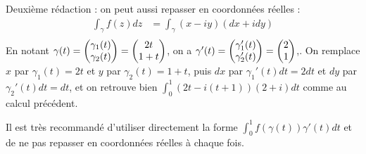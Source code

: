 Deuxième rédaction : on peut aussi repasser en coordonnées réelles : 
\begin{align*}
\int_{\gamma} f(z)dz 
&= \int_{\gamma} (x-iy)(dx+idy) \\
\end{align*}
En notant $\gamma(t) = \begin{pmatrix}\gamma_1(t) \\ \gamma_2(t) \end{pmatrix} = \begin{pmatrix}2t \\ 1+t \end{pmatrix}$, on a $\gamma'(t) = \begin{pmatrix}\gamma_1'(t) \\ \gamma_2'(t) \end{pmatrix} = \begin{pmatrix}2 \\ 1 \end{pmatrix}$,.
On remplace $x$ par $\gamma_1(t)=2t$ et $y$ par $\gamma_2(t)=1+t$, puis $dx$ par $\gamma_1'(t)dt=2dt$ et $dy$ par $\gamma_2'(t)dt=dt$,  et on retrouve bien $\int_0^1 (2t-i(t+1))(2+i)dt$ comme au calcul précédent.

Il est très recommandé d'utiliser directement la forme $\int_0^1 f(\gamma(t))\gamma'(t)dt$ et de ne pas repasser en coordonnées réelles à chaque fois.

